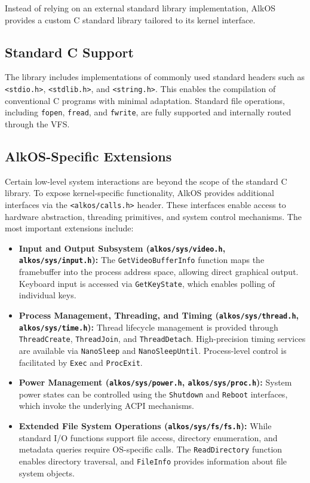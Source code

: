 \documentclass[a4paper,10pt,twoside]{report}
\theoremstyle{definition}
\begin{document}
Instead of relying on an external standard library implementation, AlkOS provides a custom C standard library tailored to its kernel interface.

\subsection{Standard C Support}

The library includes implementations of commonly used standard headers such as \texttt{<stdio.h>}, \texttt{<stdlib.h>}, and \texttt{<string.h>}. This enables the compilation of conventional C programs with minimal adaptation. Standard file operations, including \texttt{fopen}, \texttt{fread}, and \texttt{fwrite}, are fully supported and internally routed through the VFS.

\subsection{AlkOS-Specific Extensions}

Certain low-level system interactions are beyond the scope of the standard C library. To expose kernel-specific functionality, AlkOS provides additional interfaces via the \texttt{<alkos/calls.h>} header. These interfaces enable access to hardware abstraction, threading primitives, and system control mechanisms. The most important extensions include:

\begin{itemize}
    \item \textbf{Input and Output Subsystem (\texttt{alkos/sys/video.h}, \texttt{alkos/sys/input.h}):}
    The \texttt{GetVideoBufferInfo} function maps the framebuffer into the process address space, allowing direct graphical output. Keyboard input is accessed via \texttt{GetKeyState}, which enables polling of individual keys.

    \item \textbf{Process Management, Threading, and Timing (\texttt{alkos/sys/thread.h}, \texttt{alkos/sys/time.h}):}
    Thread lifecycle management is provided through \texttt{ThreadCreate}, \texttt{ThreadJoin}, and \texttt{ThreadDetach}. High-precision timing services are available via \texttt{NanoSleep} and \texttt{NanoSleepUntil}. Process-level control is facilitated by \texttt{Exec} and \texttt{ProcExit}.

    \item \textbf{Power Management (\texttt{alkos/sys/power.h}, \texttt{alkos/sys/proc.h}):}
    System power states can be controlled using the \texttt{Shutdown} and \texttt{Reboot} interfaces, which invoke the underlying ACPI mechanisms.

    \item \textbf{Extended File System Operations (\texttt{alkos/sys/fs/fs.h}):}
    While standard I/O functions support file access, directory enumeration, and metadata queries require OS-specific calls. The \texttt{ReadDirectory} function enables directory traversal, and \texttt{FileInfo} provides information about file system objects.
\end{itemize}
\end{document}
